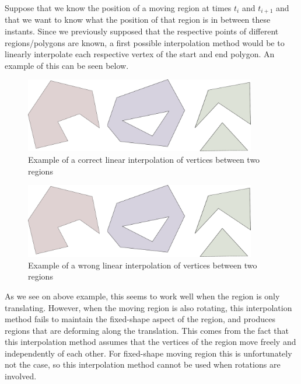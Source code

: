 		Suppose that we know the position of a moving region at times \( t_i \) and \( t_{i+1} \) and that we want to know what the position of that region is in between these instants. Since we previously supposed that the respective points of different regions/polygons are known, a first possible interpolation method would be to linearly interpolate each respective vertex of the start and end polygon. An example of this can be seen below. 
		
		
		\begin{figure}[h]
			\centering
			\includegraphics[width=0.9\textwidth]{images/polygons.pdf}
			\caption{Example of a correct linear interpolation of vertices between two regions}
			\label{fig:correct_vertices_interpol}
		\end{figure}
		
		\begin{figure}[h]
			\centering
			\includegraphics[width=0.9\textwidth]{images/polygons.pdf}
			\caption{Example of a wrong linear interpolation of vertices between two regions}
			\label{fig:wrong_vertices_interpol}
		\end{figure}

		As we see on above example, this seems to work well when the region is only translating. However, when the moving region is also rotating, this interpolation method fails to maintain the fixed-shape aspect of the region, and produces regions that are deforming along the translation. This comes from the fact that this interpolation method assumes that the vertices of the region move freely and independently of each other. For fixed-shape moving region this is unfortunately not the case, so this interpolation method cannot be used when rotations are involved. 

